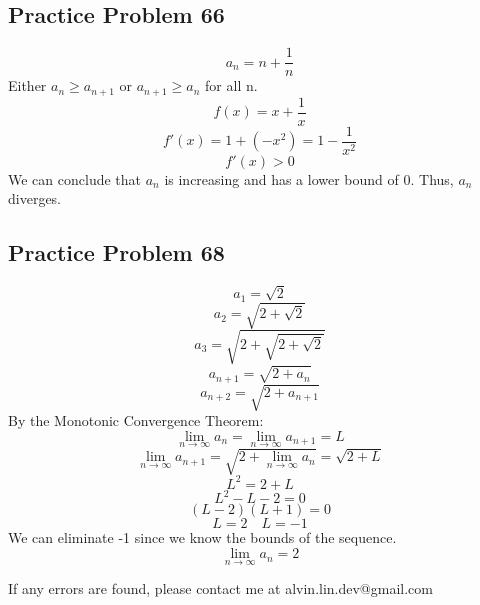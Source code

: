\documentclass[letterpaper, 12pt]{math}
\begin{document}
\subsection*{Practice Problem 66}
\[ a_{n} = n+\frac{1}{n} \]
Either \( a_{n} \geq a_{n+1} \) or \( a_{n+1} \geq a_{n} \) for all n.
\[ f(x) = x+\frac{1}{x} \]
\[ f'(x) = 1+(-x^{2}) = 1-\frac{1}{x^{2}} \]
\[ f'(x) > 0 \]
We can conclude that \( a_{n} \) is increasing and has a lower bound of 0.
Thus, \( a_{n} \) diverges.

\subsection*{Practice Problem 68}
\[ a_{1} = \sqrt{2} \]
\[ a_{2} = \sqrt{2+\sqrt{2}} \]
\[ a_{3} = \sqrt{2+\sqrt{2+\sqrt{2}}} \]
\[ a_{n+1} = \sqrt{2+a_{n}} \]
\[ a_{n+2} = \sqrt{2+a_{n+1}} \]
By the Monotonic Convergence Theorem:
\[ \lim_{n\to\infty}{a_{n}} = \lim_{n\to\infty}{a_{n+1}} = L \]
\[ \lim_{n\to\infty}{a_{n+1}} = \sqrt{2+\lim_{n\to\infty}{a_{n}}} =
   \sqrt{2+L} \]
\[ L^{2} = 2+L \]
\[ L^{2}-L-2 = 0 \]
\[ (L-2)(L+1) = 0 \]
\[ L = 2 \quad L = -1 \]
We can eliminate -1 since we know the bounds of the sequence.
\[ \lim_{n\to\infty}{a_{n}} = 2 \]

\begin{center}
  If any errors are found, please contact me at alvin.lin.dev@gmail.com
\end{center}
\end{document}
